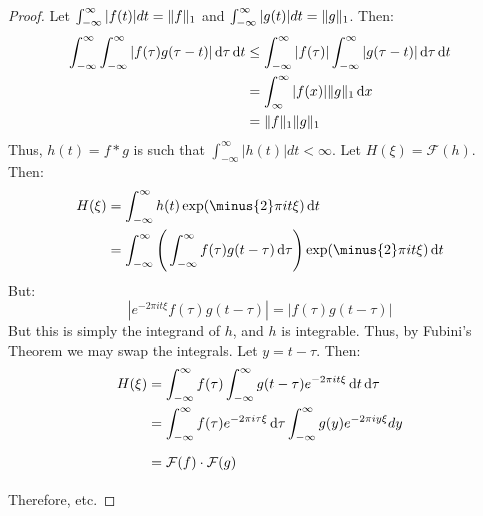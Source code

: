     \begin{proof}
    Let $\int_{-\infty}^{\infty} |f(t)|dt = \lVert f\rVert_{1}$ and $\int_{-\infty}^{\infty} |g(t)|dt = \lVert g\rVert_{1}$. Then:
    \begin{align*}
        \int_{-\infty}^{\infty}\int_{-\infty}^{\infty}
            |f(\tau)g(\tau-t)|\mathop{}\!\mathrm{d}{\tau}\mathop{}\!\mathrm{d}{t}
        &\leq\int_{-\infty}^{\infty}
            |f(\tau)|\int_{-\infty}^{\infty}
            |g(\tau-t)|\mathop{}\!\mathrm{d}{\tau}\mathop{}\!\mathrm{d}{t}\\
        &=\int_{\infty}^{\infty}
            |f(x)|\lVert g\rVert_{1}\mathop{}\!\mathrm{d}{x}\\
        &=\lVert f\rVert_{1}\lVert g\rVert_{1}
    \end{align*}
    Thus, $h(t)=f*g$ is such that
    $\int_{-\infty}^{\infty} |h(t)|dt < \infty$.
    Let $H(\xi) = \mathcal{F}(h)$. Then:
    \begin{align}
        H(\xi)&=
            \int_{-\infty}^{\infty}
            h(t)\exp(\minus{2}\pi{i}t\xi)\diff{t}\\
        &=\int_{-\infty}^{\infty}
            \Bigg(
                \int_{-\infty}^{\infty}
                f(\tau)g(t-\tau)\diff{\tau}
            \Bigg)\exp(\minus{2}\pi{i}t\xi)\diff{t}
    \end{align}
    But:
    \begin{equation}
        |e^{-2\pi{i}t\xi}f(\tau)g(t-\tau)|
        =|f(\tau)g(t-\tau)|
    \end{equation}
    But this is simply the integrand of $h$, and $h$
    is integrable. Thus, by Fubini's Theorem we may
    swap the integrals. Let $y=t-\tau$. Then:
    \begin{subequations}
        \begin{align}
            H(\xi)&=
                \int_{-\infty}^{\infty}f(\tau)
                \int_{-\infty}^{\infty}g(t-\tau)
                e^{-2\pi{i}t\xi}\diff{t}\diff{\tau}\\
            &=\int_{-\infty}^{\infty}f(\tau)
                e^{-2\pi{i}\tau\xi}\diff{\tau}
                \int_{-\infty}^{\infty}g(y)
                e^{-2\pi{i}y\xi}dy\\
            &=\mathcal{F}(f)\cdot\mathcal{F}(g)
                \vphantom{\int_{-\infty}^{\infty}}
        \end{align}
    \end{subequations}
    Therefore, etc.
    \end{proof}
